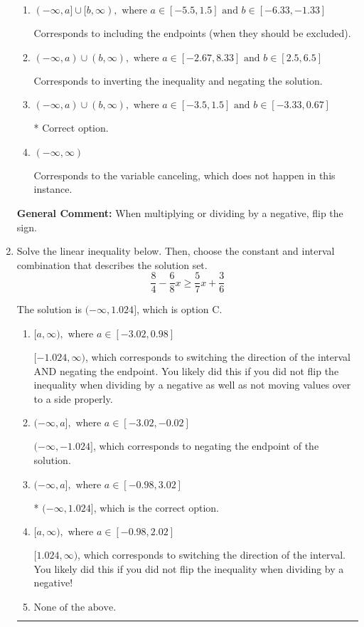 \documentclass{extbook}[14pt]
\newcommand{\litem}[1]{\item #1

\rule{\textwidth}{0.4pt}}
\begin{document}
\begin{enumerate}
{\begin{enumerate}[label=\Alph*.]
Corresponds to including the endpoints AND negating.
\item \( (-\infty, a] \cup [b, \infty), \text{ where } a \in [-5.5, 1.5] \text{ and } b \in [-6.33, -1.33] \)

Corresponds to including the endpoints (when they should be excluded).
\item \( (-\infty, a) \cup (b, \infty), \text{ where } a \in [-2.67, 8.33] \text{ and } b \in [2.5, 6.5] \)

Corresponds to inverting the inequality and negating the solution.
\item \( (-\infty, a) \cup (b, \infty), \text{ where } a \in [-3.5, 1.5] \text{ and } b \in [-3.33, 0.67] \)

 * Correct option.
\item \( (-\infty, \infty) \)

Corresponds to the variable canceling, which does not happen in this instance.
\end{enumerate}

\textbf{General Comment:} When multiplying or dividing by a negative, flip the sign.
}
\litem{
Solve the linear inequality below. Then, choose the constant and interval combination that describes the solution set.
\[ \frac{8}{4} - \frac{6}{8} x \geq \frac{5}{7} x + \frac{3}{6} \]

The solution is \( (-\infty, 1.024] \), which is option C.\begin{enumerate}[label=\Alph*.]
\item \( [a, \infty), \text{ where } a \in [-3.02, 0.98] \)

 $[-1.024, \infty)$, which corresponds to switching the direction of the interval AND negating the endpoint. You likely did this if you did not flip the inequality when dividing by a negative as well as not moving values over to a side properly.
\item \( (-\infty, a], \text{ where } a \in [-3.02, -0.02] \)

 $(-\infty, -1.024]$, which corresponds to negating the endpoint of the solution.
\item \( (-\infty, a], \text{ where } a \in [-0.98, 3.02] \)

* $(-\infty, 1.024]$, which is the correct option.
\item \( [a, \infty), \text{ where } a \in [-0.98, 2.02] \)

 $[1.024, \infty)$, which corresponds to switching the direction of the interval. You likely did this if you did not flip the inequality when dividing by a negative!
\item \( \text{None of the above}. \)


\end{enumerate}}
\end{enumerate}
\end{document}
